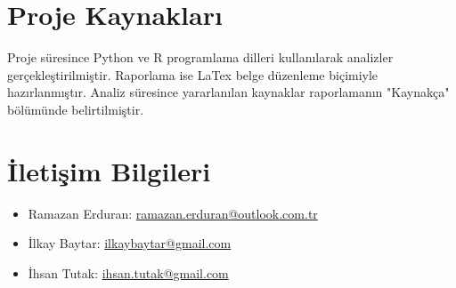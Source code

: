 \documentclass{article}
\begin{document}
\section{Proje Kaynakları}
Proje süresince Python ve R programlama dilleri kullanılarak analizler gerçekleştirilmiştir. Raporlama ise LaTex belge düzenleme biçimiyle hazırlanmıştır. 
Analiz süresince yararlanılan kaynaklar raporlamanın "Kaynakça" bölümünde belirtilmiştir.

\section{İletişim Bilgileri}
\begin{itemize}
    \item Ramazan Erduran: \href{mailto:ramazan.erduran@outlook.com.tr}{ramazan.erduran@outlook.com.tr}
    \item İlkay Baytar: \href{mailto:ilkaybaytar@gmail.com}{ilkaybaytar@gmail.com}
    \item İhsan Tutak: \href{mailto:ihsan.tutak@gmail.com}{ihsan.tutak@gmail.com}
\end{itemize}
\end{document}

